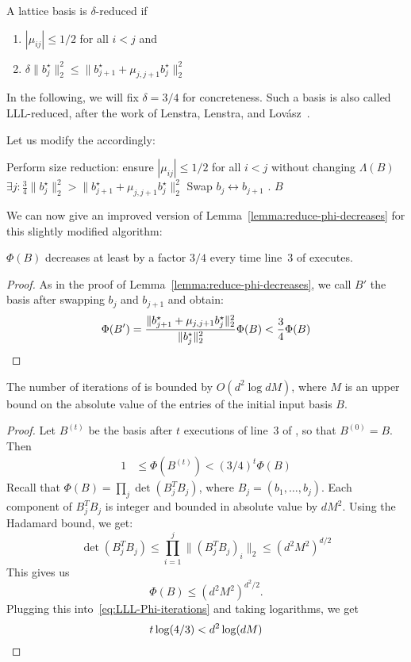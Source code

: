 \begin{definition}
  A lattice basis is $\delta$-reduced if
  \begin{enumerate}
    \item $|\mu_{ij}| \leq 1/2$ for all $i < j$ and
    \item $\delta \|b_j^\star\|_2^2 \leq \|b_{j+1}^\star + \mu_{j,j+1} b_j^\star\|_2^2$
  \end{enumerate}
\end{definition}
In the following, we will fix $\delta = 3/4$ for concreteness.
Such a basis is also called LLL-reduced,
after the work of Lenstra, Lenstra, and Lovász~\cite{MR682664}.

Let us modify the  accordingly:
\begin{codebox}
  \li Perform size reduction: ensure $|\mu_{ij}| \leq 1/2$ for all $i < j$ without changing $\Lambda(B)$
  \li \If $\exists j: \frac{3}{4} \|b_j^\star\|_2^2 > \|b_{j+1}^\star + \mu_{j,j+1} b_j^\star\|_2^2$
  \li \Then Swap $b_j \leftrightarrow b_{j+1}$
  \li       {}.
      \End
  \li \Return $B$
\end{codebox}

We can now give an improved version of Lemma~\ref{lemma:reduce-phi-decreases} for this slightly modified algorithm:

\begin{lemma}
  \label{lemma:lll-reduce-phi-decreases}
  $\Phi(B)$ decreases at least by a factor $3/4$ every time line~3 of  executes.
\end{lemma}
\begin{proof}
  As in the proof of Lemma~\ref{lemma:reduce-phi-decreases},
  we call $B'$ the basis after swapping $b_j$ and $b_{j+1}$ and obtain:
  \[
    \Phi(B') = \frac{\|b_{j+1}^\star + \mu_{j,j+1} b_j^\star\|_2^2}{\|b_j^\star\|_2^2} \Phi(B) < \frac{3}{4} \Phi(B) \qedhere
  \]
\end{proof}

\begin{lemma}
  \label{lemma:lll-iterations}
  The number of iterations of  is bounded by $O(d^2 \log dM)$,
  where $M$ is an upper bound on the absolute value of the entries of the initial input basis $B$.
\end{lemma}
\begin{proof}
  Let $B^{(t)}$ be the basis after $t$ executions of line~3 of , so that $B^{(0)} = B$.
  Then
  \begin{align}
    \label{eq:LLL-Phi-iterations}
    1 &\leq \Phi(B^{(t)}) < (3/4)^t \Phi(B)
  \end{align}
  Recall that $\Phi(B) = \prod_j \det(B_j^T B_j)$,
  where $B_j = (b_1, \ldots, b_j)$.
  Each component of $B_j^T B_j$ is integer and bounded in absolute value by $dM^2$.
  Using the Hadamard bound, we get:
  \[
    \det(B_j^T B_j) \leq \prod_{i=1}^j \| (B_j^T B_j)_i \|_2 \leq (d^2M^2)^{d/2}
  \]
  This gives us
  \[
    \Phi(B) \leq (d^2 M^2)^{d^2/2}.
  \]
  Plugging this into~\eqref{eq:LLL-Phi-iterations} and taking logarithms, we get
  \[
    t \log(4/3) < d^2 \log(dM) \qedhere
  \]
\end{proof}

